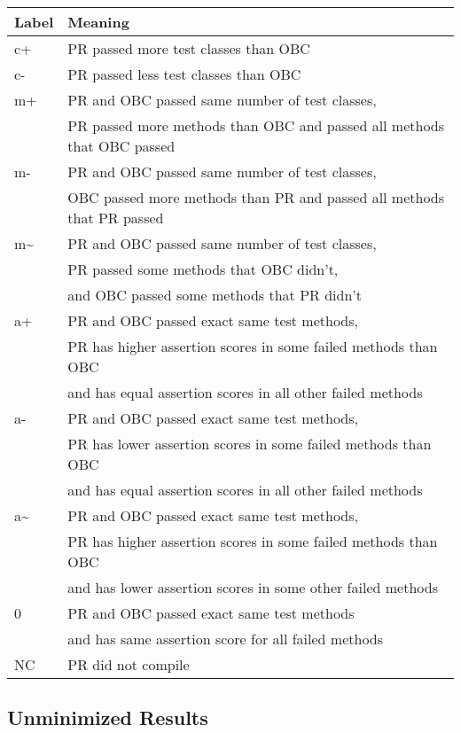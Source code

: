 \documentclass[sigconf, timestamp-false, anonymous=true]{acmart}
\begin{document}
\begin{tabular}{| l | l |}
\hline
  Label & Meaning \\
  
  \hline
  c+ & PR passed more test classes than OBC  \\\hline
  c- & PR passed less test classes than OBC  \\\hline
  m+ & PR and OBC passed same number of test classes, \\
  & PR passed more methods than OBC and passed all methods that OBC passed\\\hline
  m- & PR and OBC passed same number of test classes, \\
  & OBC passed more methods than PR and passed all methods that PR passed\\\hline
  m\~ & PR and OBC passed same number of test classes, \\
  & PR passed some methods that OBC didn't, \\
  & and OBC passed some methods that PR didn't \\\hline
  a+ & PR and OBC passed exact same test methods, \\
  & PR has higher assertion scores in some failed methods than OBC \\
  & and has equal assertion scores in all other failed methods \\\hline
  a- & PR and OBC passed exact same test methods, \\
  & PR has lower assertion scores in some failed methods than OBC \\
  & and has equal assertion scores in all other failed methods \\\hline
  a\~ & PR and OBC passed exact same test methods, \\
  & PR has higher assertion scores in some failed methods than OBC \\
  & and has lower assertion scores in some other failed methods \\\hline
  0 & PR and OBC passed exact same test methods \\
  & and has same assertion score for all failed methods \\ \hline
  NC & PR did not compile \\\hline
 
  
\end{tabular}


\subsection{Unminimized Results}
\end{document}
